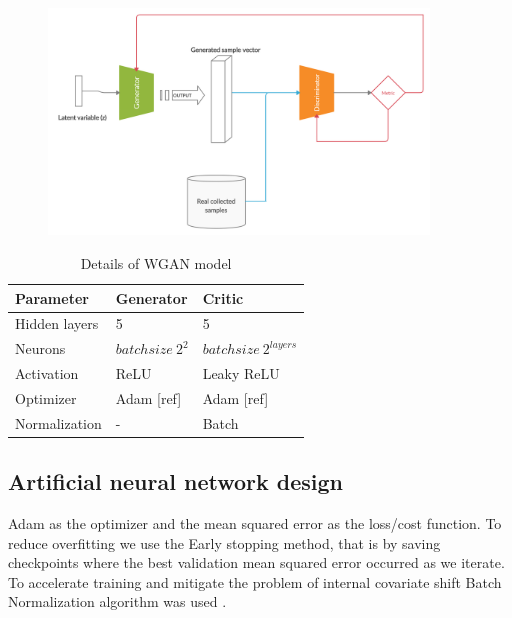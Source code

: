 \documentclass[draft, 10pt]{IEEEtran}
\begin{document}
\begin{figure}
	\centering
	\includegraphics[trim= 0 0 0 0, clip, width=0.9\textwidth]{GAN.png}
	\caption{}
\end{figure}

\begin{table}
	\centering
	\begin{tabular}{l|l|l}
		\textbf{Parameter} & \textbf{Generator} & \textbf{Critic} \\\hline
		Hidden layers & 5 & 5 \\
		Neurons & $ batchsize~2^{2} $ & $batchsize~2^{layers}$ \\
		Activation & ReLU & Leaky ReLU \\
		Optimizer & Adam [ref] & Adam [ref] \\
		Normalization & - & Batch \cite{ioffe2015batch} \\
	\end{tabular}
	\caption{Details of WGAN model}
	\label{tbl:gandetails}
\end{table}

\subsection{Artificial neural network design}
\label{ssec:ann}


Adam \cite{kingma2014adam} as the optimizer and the mean squared error as the loss/cost function. To reduce overfitting we use the Early stopping method, that is by saving checkpoints where the best validation mean squared error occurred as we iterate. To accelerate training and mitigate the problem of internal covariate shift Batch Normalization algorithm was used \cite{ioffe2015batch}.
\end{document}
